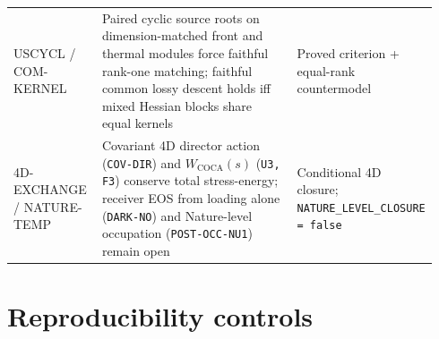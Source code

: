 \documentclass[11pt]{article}
\begin{document}
\begin{longtable}{@{}L{0.21\linewidth}L{0.51\linewidth}L{0.22\linewidth}@{}}
USCYCL / COM-KERNEL & Paired cyclic source roots on dimension-matched front and thermal modules force faithful rank-one matching; faithful common lossy descent holds iff mixed Hessian blocks share equal kernels & Proved criterion + equal-rank countermodel \\
4D-EXCHANGE / NATURE-TEMP & Covariant 4D director action (\texttt{COV-DIR}) and \(W_{\mathrm{COCA}}(s)\) (\texttt{U3, F3}) conserve total stress-energy; receiver EOS from loading alone (\texttt{DARK-NO}) and Nature-level occupation (\texttt{POST-OCC-NU1}) remain open & Conditional 4D closure; {\small\texttt{NATURE\_LEVEL\_\allowbreak CLOSURE = false}} \\
\bottomrule
\end{longtable}

\section{Reproducibility controls}
\end{document}
